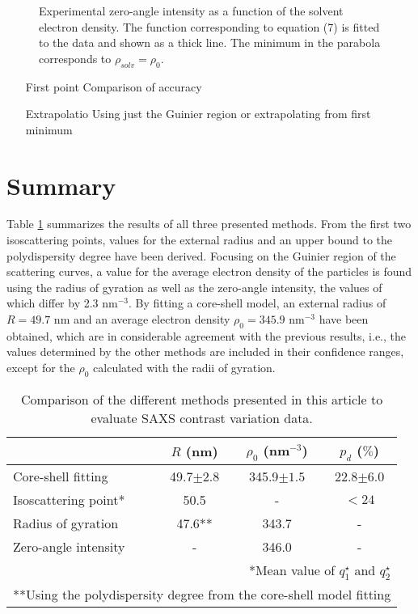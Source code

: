 \begin{figure}%
	\centering
		
		\caption{Experimental zero-angle intensity as a function of the solvent electron density. The function corresponding to equation (7) is fitted to the data and shown as a thick line. The minimum in the parabola corresponds to $\rho_{solv}=\rho_0$.}
		\label{fig:KiskerIntensityParabola}
\end{figure}

\begin{itemize}
	\item [First point] Comparison of accuracy
	\item [Extrapolatio] Using just the Guinier region or extrapolating from first minimum
\end{itemize}

\section{Summary}
\label{sec:KiskerResultsSummary}
Table \ref{tab:comparison_results_Kisker} summarizes the results of all three presented methods. From the first two isoscattering points, values for the external radius and an upper bound to the polydispersity degree have been derived. Focusing on the Guinier region of the scattering curves, a value for the average electron density of the particles is found using the radius of gyration as well as the zero-angle intensity, the values of which differ by 2.3 nm\(^{-3}\). By fitting a core-shell model, an external radius of \(R=49.7\) nm and an average electron density \(\rho_0=345.9\) nm\(^{-3}\) have been obtained, which are in considerable agreement with the previous results, i.e., the values determined by the other methods are included in their confidence ranges, except for the \(\rho_0\) calculated with the radii of gyration.

\begin{table}
\caption{Comparison of the different methods presented in this article to evaluate SAXS contrast variation data.}
\begin{tabular}{l|ccc}
 & \( R\) (nm)    & \(\rho_0\) (nm\(^{-3}\)) & \(p_d\) (\(\%\))\\
\hline
 Core-shell fitting &  49.7\(\pm 2.8\)   &     345.9\(\pm 1.5\)      & 22.8\(\pm 6.0\) \\
 Isoscattering point* &  50.5 &     -          & $<24$  \\
 Radius of gyration &  47.6**      &     343.7      & -    \\
 Zero-angle intensity &  -    &     346.0      & -    \\ \hline
\multicolumn{4}{r}{*Mean value of \(q^{\star}_1\) and \(q^{\star}_2\)}\\  
\multicolumn{4}{r}{**Using the polydispersity degree from the core-shell model fitting}\\ 
\end{tabular}
\label{tab:comparison_results_Kisker}
\end{table}

